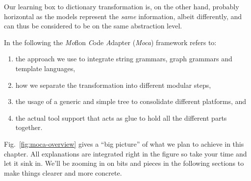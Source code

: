Our learning box to dictionary transformation is, on the other hand, probably horizontal as the models represent the \emph{same} information, albeit differently, and can thus be considered to be on the same abstraction level.

\vspace{1.5cm}


In the following the \emph{Mo}flon \emph{C}ode \emph{A}dapter (\emph{Moca}) framework refers to:
\begin{enumerate}
 \item the approach we use to integrate string grammars, graph grammars and template languages, 
 \item how we separate the transformation into different modular steps, 
 \item the usage of a generic and simple tree to consolidate different platforms, and 
 \item the actual tool support that acts as glue to hold all the different parts together.
\end{enumerate}
 
Fig.~\ref{fig:moca-overview} gives a ``big picture'' of what we plan to achieve in this chapter.
All explanations are integrated right in the figure so take your time and let it sink in.
We'll be zooming in on bits and pieces in the following sections to make things clearer and more concrete.

